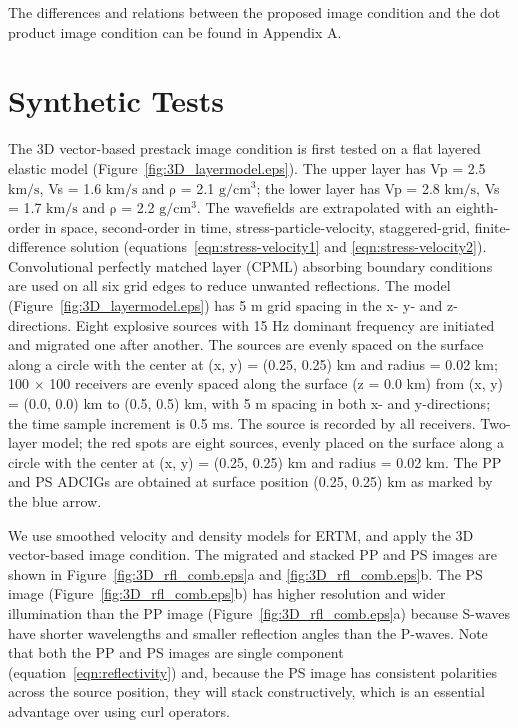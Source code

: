 \documentclass[manuscript,ulem,graphix,revised]{geophysics}
\begin{document}
The differences and relations between the proposed image condition and the dot product image condition \citep{wang_cl16} can be found in Appendix A.



\section{Synthetic Tests}

The 3D vector-based prestack image condition is first tested on a flat layered elastic model (Figure~\ref{fig:3D_layermodel.eps}). The upper layer has Vp = 2.5 $\mathrm{km/s}$,  Vs = 1.6 $\mathrm{km/s}$ and  $\mathrm{\rho}$ = 2.1 $\mathrm{g/cm^3}$; the lower layer has  Vp = 2.8 $\mathrm{km/s}$,  Vs = 1.7 $\mathrm{km/s}$ and  $\mathrm{\rho}$ = 2.2 $\mathrm{g/cm^3}$.
The wavefields are extrapolated with an eighth-order in space, second-order in time, stress-particle-velocity, staggered-grid, finite-difference solution (equations~\ref{eqn:stress-velocity1} and \ref{eqn:stress-velocity2}). Convolutional perfectly matched layer (CPML) absorbing boundary conditions \citep{komatitsch07} are used on all six grid edges to reduce unwanted reflections.
The model (Figure~\ref{fig:3D_layermodel.eps}) has 5 m grid spacing in the x- y- and z-directions. 
Eight explosive sources with 15 Hz dominant frequency are initiated and migrated one after another. The sources are evenly spaced on the surface along a circle with the center at (x, y) = (0.25, 0.25) km and radius = 0.02 km; 100 $\times$ 100 receivers are evenly spaced along the surface (z = 0.0 km) from  (x, y) = (0.0, 0.0) km to (0.5, 0.5) km, with 5 m spacing in both x- and y-directions; the time sample increment is 0.5 ms. The source is recorded by all receivers.
{
Two-layer model; the red spots are eight sources, evenly placed on the surface along a circle with the center at (x, y) = (0.25, 0.25) km and radius = 0.02 km. The PP and PS ADCIGs are obtained at surface position (0.25, 0.25) km as marked by the blue arrow.
}

We use smoothed velocity and density models for ERTM, and apply the 3D vector-based image condition. The migrated and stacked PP and PS images are shown in Figure~\ref{fig:3D_rfl_comb.eps}a and \ref{fig:3D_rfl_comb.eps}b. The PS image (Figure~\ref{fig:3D_rfl_comb.eps}b) has higher resolution and wider illumination than the PP image (Figure~\ref{fig:3D_rfl_comb.eps}a) because S-waves have shorter wavelengths and smaller reflection angles than the P-waves. Note that both the PP and PS images are single component (equation~\ref{eqn:reflectivity}) and, because the PS image has consistent polarities across the source position, they will stack constructively, which is an essential advantage over using curl operators. 
\end{document}
